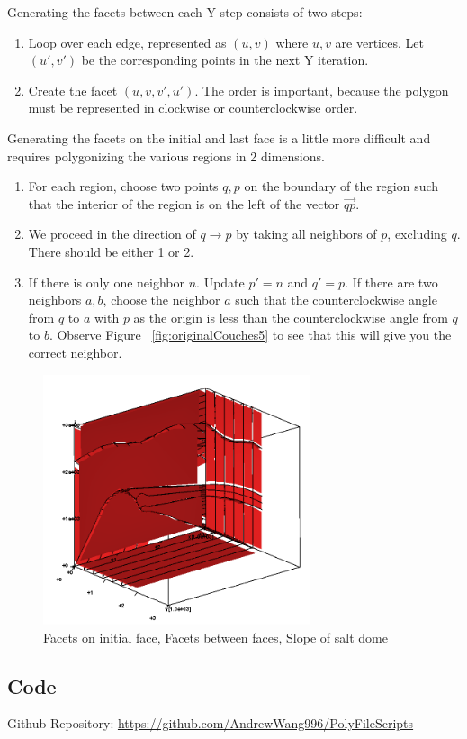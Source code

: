 Generating the facets between each Y-step consists of two steps:
\begin{enumerate}
\item Loop over each edge, represented as $(u,v)$ where $u,v$ are vertices. Let $(u',v')$ be the corresponding points in the next Y iteration.
\item Create the facet $(u, v, v', u')$. The order is important, because the polygon must be represented in clockwise or counterclockwise order.
\end{enumerate}

Generating the facets on the initial and last face is a little more difficult and requires polygonizing the various regions in 2 dimensions. 
\begin{enumerate}
\item For each region, choose two points $q,p$ on the boundary of the region such that the interior of the region is on the left of the vector $\vec{qp}$. 
\item We proceed in the direction of $q \rightarrow p$ by taking all neighbors of $p$, excluding $q$. There should be either 1 or 2.
\item If there is only one neighbor $n$. Update $p'=n$ and $q'=p$. If there are two neighbors $a,b$, choose the neighbor $a$ such that the counterclockwise angle from $q$ to $a$ with $p$ as the origin is less than the counterclockwise angle from $q$ to $b$. Observe Figure ~\ref{fig:originalCouches5} to see that this will give you the correct neighbor.
\end{enumerate}



\begin{figure}[H]
\centering
\includegraphics[width=0.7\textwidth]{Images/Facets.png}
\caption{Facets on initial face, Facets between faces, Slope of salt dome}
\label{fig:facets}
\end{figure}




\subsection{Code}

Github Repository: \href{https://github.com/AndrewWang996/PolyFileScripts}{https://github.com/AndrewWang996/PolyFileScripts}




